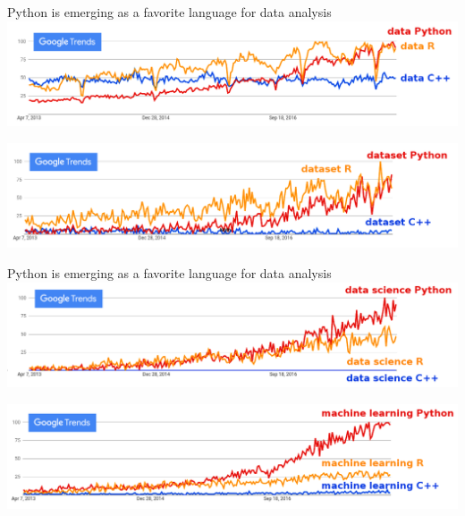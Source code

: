 \documentclass[aspectratio=169]{beamer}
\begin{document}
\begin{frame}{Python is emerging as a favorite language for data analysis}
\vspace{0.5 cm}
\includegraphics[width=\linewidth]{python-r-cpp-googletrends-data.png}

\vspace{1 cm}
\includegraphics[width=\linewidth]{python-r-cpp-googletrends-dataset.png}
\end{frame}

\begin{frame}{Python is emerging as a favorite language for data analysis}
\vspace{0.5 cm}
\includegraphics[width=\linewidth]{python-r-cpp-googletrends-datascience.png}

\vspace{1 cm}
\includegraphics[width=\linewidth]{python-r-cpp-googletrends-machinelearning.png}
\end{frame}
\end{document}

